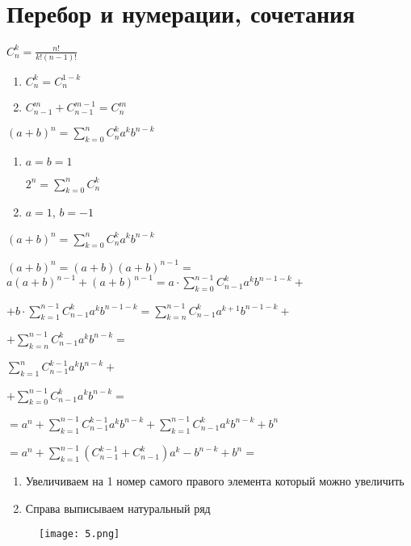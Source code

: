 \section{Перебор и нумерации, сочетания}


$C_n^k = \frac{n!}{k!(n-1)!}$

\begin{enumerate}
    \item $C_n^k = C_n^{1-k}$
    \item $C_{n-1}^m + C_{n-1}^{m-1} = C_n^m$ 
\end{enumerate}


$(a + b)^n = \sum_{k = 0}^{n}C_n^k a^k b^{n-k}$


\begin{enumerate}
    \item $a = b = 1$

$2^n = \sum_{k = 0}^{n}C_n^k$

    \item $a = 1$, $b = -1$
    
\end{enumerate}


$(a + b)^n = \sum_{k = 0}^{n}C_n^k a^k b^{n-k}$

$(a + b)^n = (a+b)(a+b)^{n-1} = $
$a(a +b)^{n- 1} + (a + b)^{n - 1} = a \cdot \sum_{k = 0}^{n - 1}C_{n-1}^k a^k b^{n-1-k} +$

$+ b \cdot \sum_{k = 1}^{n-1}C_{n-1}^k a^k b^{n-1-k} = \sum_{k = n}^{n - 1} C_{n-1}^k a^{k + 1} b^{n-1-k} +$

$+ \sum_{k=n}^{n - 1} C_{n-1}^k a^k b^{n-k} = $

$\sum_{k = 1}^{n} C_{n-1}^{k-1} a^k b^{n-k} +$

$+ \sum_{k = 0}^{n - 1} C_{n-1}^k a^k b^{n-k} =$

$= a^n + \sum_{k = 1}^{n - 1} C_{n - 1}^{k-1} a^k b^{n-k} + \sum_{k = 1}^{n - 1} C_{n-1}^k a^k b^{n-k} + b^n$

$= a^n + \sum_{k = 1}^{n - 1}(C_{n-1}^{k-1} + C_{n-1}^k) a^k - b^{n-k} + b^n = $


\begin{enumerate}
    \item Увеличиваем на 1 номер самого правого элемента который можно увеличить
    \item Справа выписываем натуральный ряд
\end{enumerate}

\begin{figure}[H] %
    \centering
    \texttt{[image: 5.png]}
    
    
    \label{fig:5}
\end{figure}

